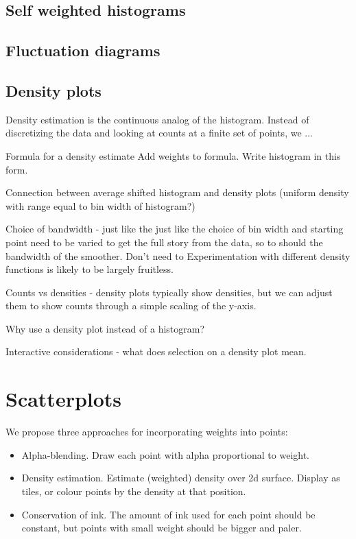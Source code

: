 \documentclass[oneside,letterpaper]{scrartcl}
\begin{document}
\subsection{Self weighted histograms}\label{sub:self_weighted_histograms} %


\subsection{Fluctuation diagrams}\label{sub:fluctuation_diagrams}


\subsection{Density plots}\label{sub:density_estimation}

Density estimation is the continuous analog of the histogram.  Instead of discretizing the data and looking at counts at a finite set of points, we ...

Formula for a density estimate
Add weights to formula.
Write histogram in this form.

Connection between average shifted histogram and density plots (uniform density with range equal to bin width of histogram?)

Choice of bandwidth - just like the just like the choice of bin width and starting point need to be varied to get the full story from the data, so to should the bandwidth of the smoother.  Don't  need to  Experimentation with different density functions is likely to be largely fruitless.

Counts vs densities - density plots typically show densities, but we can adjust them to show counts through a simple scaling of the y-axis.  

Why use a density plot instead of a histogram?

Interactive considerations - what does selection on a density plot mean.

\section{Scatterplots}\label{sec:scatterplots}

We propose three approaches for incorporating weights into points:

\begin{itemize}
  \item Alpha-blending.  Draw each point with alpha proportional to weight.
  \item Density estimation.  Estimate (weighted) density over 2d surface.  Display as tiles, or colour points by the density at that position.
  \item Conservation of ink.  The amount of ink used for each point should be constant, but points with small weight should be bigger and paler.
\end{itemize}
\end{document}
